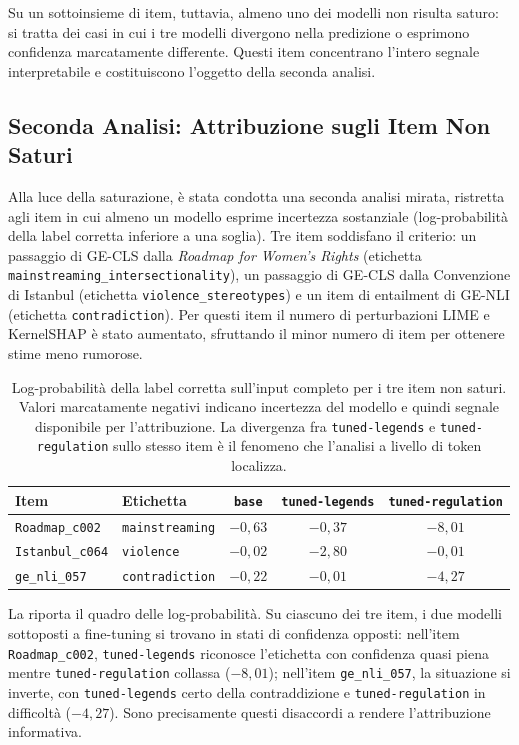 \documentclass[pdflatex, sn-apa]{sn-jnl}%
\theoremstyle{thmstyleone}%
\theoremstyle{thmstyletwo}%
\theoremstyle{thmstylethree}%
\newcommand{\modelbase}{\texttt{base}}
\newcommand{\modellegends}{\texttt{tuned-legends}}
\newcommand{\modelreg}{\texttt{tuned-regulation}}
\begin{document}
Su un sottoinsieme di item, tuttavia, almeno uno dei modelli non risulta saturo:
si tratta dei casi in cui i tre modelli divergono nella predizione o esprimono
confidenza marcatamente differente. Questi item concentrano l'intero segnale
interpretabile e costituiscono l'oggetto della seconda analisi.

\subsection{Seconda Analisi: Attribuzione sugli Item Non Saturi}
\label{sec:xai:targeted}

Alla luce della saturazione, è stata condotta una seconda analisi mirata,
ristretta agli item in cui almeno un modello esprime incertezza sostanziale
(log-probabilità della label corretta inferiore a una soglia). Tre item
soddisfano il criterio: un passaggio di GE-CLS dalla \textit{Roadmap for Women's
Rights} (etichetta \texttt{mainstreaming\_intersectionality}), un passaggio di
GE-CLS dalla Convenzione di Istanbul (etichetta \texttt{violence\_stereotypes}) e
un item di entailment di GE-NLI (etichetta \texttt{contradiction}). Per questi
item il numero di perturbazioni LIME e KernelSHAP è stato aumentato, sfruttando il
minor numero di item per ottenere stime meno rumorose.

\begin{table}[h]
\centering
\caption{Log-probabilità della label corretta sull'input completo per i tre item
non saturi. Valori marcatamente negativi indicano incertezza del modello e quindi
segnale disponibile per l'attribuzione. La divergenza fra \modellegends{} e
\modelreg{} sullo stesso item è il fenomeno che l'analisi a livello di token
localizza.}
\label{tab:xai_nonsat}
\small
\begin{tabular}{@{}llccc@{}}
\toprule
Item & Etichetta & \modelbase & \modellegends & \modelreg \\
\midrule
\texttt{Roadmap\_c002}   & \texttt{mainstreaming}  & $-0{,}63$ & $-0{,}37$ & $-8{,}01$ \\
\texttt{Istanbul\_c064}  & \texttt{violence}       & $-0{,}02$ & $-2{,}80$ & $-0{,}01$ \\
\texttt{ge\_nli\_057}    & \texttt{contradiction}  & $-0{,}22$ & $-0{,}01$ & $-4{,}27$ \\
\bottomrule
\end{tabular}
\end{table}

La  riporta il quadro delle log-probabilità. Su ciascuno dei
tre item, i due modelli sottoposti a fine-tuning si trovano in stati di confidenza
opposti: nell'item \texttt{Roadmap\_c002}, \modellegends{} riconosce l'etichetta
con confidenza quasi piena mentre \modelreg{} collassa ($-8{,}01$); nell'item
\texttt{ge\_nli\_057}, la situazione si inverte, con \modellegends{} certo della
contraddizione e \modelreg{} in difficoltà ($-4{,}27$). Sono precisamente questi
disaccordi a rendere l'attribuzione informativa.
\end{document}
